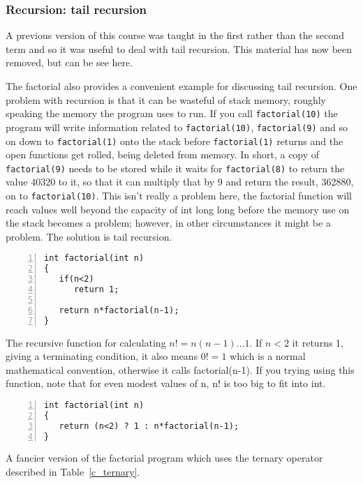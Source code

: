 \documentclass[11pt,a4paper]{scrartcl}
\begin{document}
\subsubsection*{Recursion: tail recursion}
     
A previous version of this course was taught in the first rather than
the second term and so it was useful to deal with tail recursion. This
material has now been removed, but can be see here.

The factorial also provides a convenient example for discussing tail
recursion. One problem with recursion is that it can be wasteful of
stack memory, roughly speaking the memory the program uses to run. If
you call \texttt{factorial(10)} the program will write information
related to \texttt{factorial(10)}, \texttt{factorial(9)} and so on
down to \texttt{factorial(1)} onto the stack before
\texttt{factorial(1)} returns and the open functions get rolled, being
deleted from memory. In short, a copy of \texttt{factorial(9)} needs
to be stored while it waits for \texttt{factorial(8)} to return the
value 40320 to it, so that it can multiply that by 9 and return the
result, 362880, on to \texttt{factorial(10)}. This isn't really a
problem here, the factorial function will reach values well beyond the
capacity of int long long before the memory use on the stack becomes a
problem; however, in other circumstances it might be a problem. The
solution is tail recursion.


\begin{table}[b]
\begin{lstlisting}[numbers=left]
int factorial(int n)
{
   if(n<2)
      return 1;

   return n*factorial(n-1);
}

\end{lstlisting}
\caption{The recursive function for calculating $n!=n(n-1)\ldots 1$. If $n<2$ it returns 1, giving a terminating condition, it also means $0!=1$ which is a normal mathematical convention, otherwise it calls factorial(n-1). If you trying using this function, note that for even modest values of n, n! is too big to fit into int.\label{c_factorial}}
\end{table}


\begin{table}
\begin{lstlisting}[numbers=left]
int factorial(int n)
{
   return (n<2) ? 1 : n*factorial(n-1);
}

\end{lstlisting}
\caption{A fancier version of the factorial program which uses the ternary operator described in Table~\ref{c_ternary}.\label{c_factorial_fancy}}
\end{table}
\end{document}
